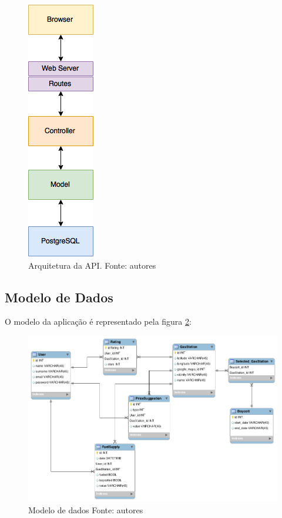 \begin{figure}[H]
    \centering
    \includegraphics[scale=0.5]{figuras/api_arch.png}
    \caption[Arquitetura da API]{Arquitetura da API. Fonte: autores}
    \label{img:arquitetura}
\end{figure}


\subsection{Modelo de Dados}

O modelo da aplicação é representado pela figura \ref{img:modelo_de_dados}:

\begin{figure}[H]
    \centering
    \includegraphics[scale=0.5]{figuras/db_model.png}
    \caption[Modelo de dados]{Modelo de dados Fonte: autores}
    \label{img:modelo_de_dados}
\end{figure}
